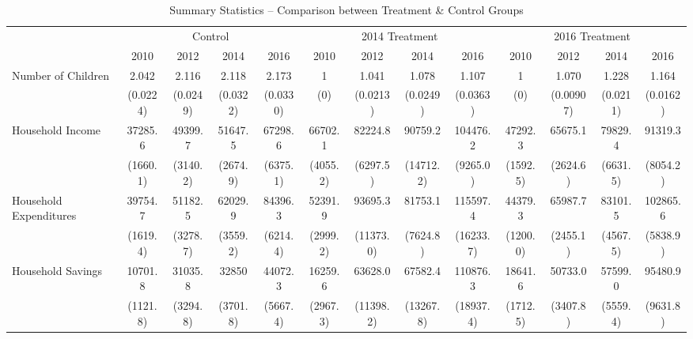 \documentclass[12pt]{extarticle}
\begin{document}
\begin{landscape}
\begin{table}
\fontsize{10}{11}\selectfont
\centering
\caption{Summary Statistics -- Comparison between Treatment \& Control Groups} \label{tab:sumstats_comp}
\begin{threeparttable}
\begin{tabular}{l*{12}{c}}
\hline\hline
                    &\multicolumn{4}{c}{Control}&\multicolumn{4}{c}{2014 Treatment}&\multicolumn{4}{c}{2016 Treatment}\\
\cmidrule(lr{.75em}){2-5}
\cmidrule(lr{.75em}){6-9}
\cmidrule(lr{.75em}){10-13}                  
                    &        2010&        2012&        2014&        2016&        2010&        2012&        2014&        2016&        2010&        2012&        2014&        2016\\
\hline
Number of Children  &       2.042&       2.116&       2.118&       2.173&           1&       1.041&       1.078&       1.107&           1&       1.070&       1.228&       1.164\\
                    &    (0.0224)&    (0.0249)&    (0.0322)&    (0.0330)&         (0)&    (0.0213)&    (0.0249)&    (0.0363)&         (0)&   (0.00907)&    (0.0211)&    (0.0162)\\
[1em]
Household Income&     37285.6&     49399.7&     51647.5&     67298.6&     66702.1&     82224.8&     90759.2&    104476.2&     47292.3&     65675.1&     79829.4&     91319.3\\
                    &    (1660.1)&    (3140.2)&    (2674.9)&    (6375.1)&    (4055.2)&    (6297.5)&   (14712.2)&    (9265.0)&    (1592.5)&    (2624.6)&    (6631.5)&    (8054.2)\\
[1em]                    
Household Expenditures&     39754.7&     51182.5&     62029.9&     84396.3&     52391.9&     93695.3&     81753.1&    115597.4&     44379.3&     65987.7&     83101.5&    102865.6\\
                    &    (1619.4)&    (3278.7)&    (3559.2)&    (6214.4)&    (2999.2)&   (11373.0)&    (7624.8)&   (16233.7)&    (1200.0)&    (2455.1)&    (4567.5)&    (5838.9)\\
[1em]
Household Savings&     10701.8&     31035.8&       32850&     44072.3&     16259.6&     63628.0&     67582.4&    110876.3&     18641.6&     50733.0&     57599.0&     95480.9\\
                    &    (1121.8)&    (3294.8)&    (3701.8)&    (5667.4)&    (2967.3)&   (11398.2)&   (13267.8)&   (18937.4)&    (1712.5)&    (3407.8)&    (5559.4)&    (9631.8)\\

\end{tabular}
\end{threeparttable}
\end{table}
\end{landscape}
\end{document}
